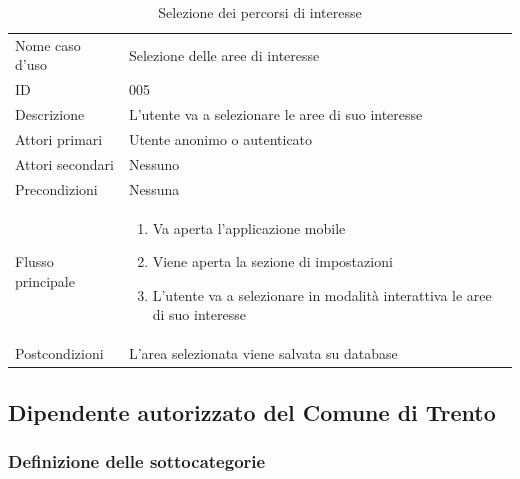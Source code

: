 \documentclass{article}
\begin{document}
\begin{table}[htbp]
    \label{8.2.5}
    \centering
    \begin{tabularx}{\textwidth}{| l | p{} |}
        \Xhline{2pt} %
        Nome caso d'uso & Selezione delle aree di interesse \\
        \Xhline{2pt} %
        ID & 005 \\
        \hline
        Descrizione & L'utente va a selezionare le aree di suo interesse\\
        \hline
        Attori primari & Utente anonimo o autenticato\\
        \hline
        Attori secondari & Nessuno \\
        \hline
        Precondizioni & Nessuna \\
        \hline
        Flusso principale & 
        \begin{enumerate}[topsep=5pt,partopsep=0pt,parsep=0pt,itemsep=0pt,before=\vspace{-\baselineskip},after=\vspace{-\baselineskip}]                
            \item Va aperta l'applicazione mobile
            \item Viene aperta la sezione di impostazioni
            \item L'utente va a selezionare in modalità interattiva le aree di suo interesse
        \end{enumerate}
        \\
        \hline
        Postcondizioni & L'area selezionata viene salvata su database \\
        \hline
    \end{tabularx}
    \caption{Selezione dei percorsi di interesse}
    \label{tab:tabella_use_case004}
\end{table}



\subsection{Dipendente autorizzato del Comune di Trento}

\subsubsection{Definizione delle sottocategorie}
\end{document}
